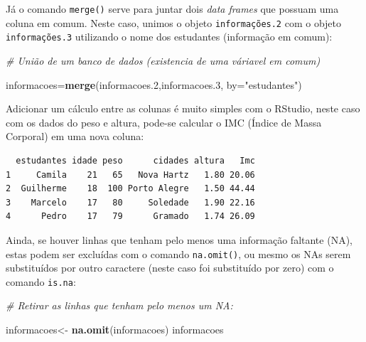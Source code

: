 \documentclass[12pt,brazil,oneside]{book}
\newenvironment{Shaded}{\begin{snugshade}}{\end{snugshade}}
\newcommand{\CommentTok}[1]{\textcolor[rgb]{0.56,0.35,0.01}{\textit{#1}}}
\newcommand{\DataTypeTok}[1]{\textcolor[rgb]{0.13,0.29,0.53}{#1}}
\newcommand{\DecValTok}[1]{\textcolor[rgb]{0.00,0.00,0.81}{#1}}
\newcommand{\FloatTok}[1]{\textcolor[rgb]{0.00,0.00,0.81}{#1}}
\newcommand{\KeywordTok}[1]{\textcolor[rgb]{0.13,0.29,0.53}{\textbf{#1}}}
\newcommand{\NormalTok}[1]{#1}
\newcommand{\OperatorTok}[1]{\textcolor[rgb]{0.81,0.36,0.00}{\textbf{#1}}}
\newcommand{\StringTok}[1]{\textcolor[rgb]{0.31,0.60,0.02}{#1}}
\begin{document}
Já o comando \texttt{merge()} serve para juntar dois \emph{data frames} que possuam uma coluna em comum. Neste caso, unimos o objeto \texttt{informações.2} com o objeto \texttt{informações.3} utilizando o nome dos estudantes (informação em comum):

\begin{Shaded}
\begin{Highlighting}[]
\CommentTok{# União de um banco de dados (existencia de uma váriavel em comum)}

\NormalTok{informacoes=}\KeywordTok{merge}\NormalTok{(informacoes}\FloatTok{.2}\NormalTok{,informacoes}\FloatTok{.3}\NormalTok{, }\DataTypeTok{by=}\StringTok{"estudantes"}\NormalTok{)}
\end{Highlighting}
\end{Shaded}

Adicionar um cálculo entre as colunas é muito simples com o RStudio, neste caso com os dados do peso e altura, pode-se calcular o IMC (Índice de Massa Corporal) em uma nova coluna:

\begin{Shaded}
\end{Shaded}

\begin{verbatim}
  estudantes idade peso      cidades altura   Imc
1     Camila    21   65   Nova Hartz   1.80 20.06
2  Guilherme    18  100 Porto Alegre   1.50 44.44
3    Marcelo    17   80     Soledade   1.90 22.16
4      Pedro    17   79      Gramado   1.74 26.09
\end{verbatim}

Ainda, se houver linhas que tenham pelo menos uma informação faltante (NA), estas podem ser excluídas com o comando \texttt{na.omit()}, ou mesmo os NAs serem substituídos por outro caractere (neste caso foi substituído por zero) com o comando \texttt{is.na}:

\begin{Shaded}
\begin{Highlighting}[]
\CommentTok{# Retirar as linhas que tenham pelo menos um NA:}

\NormalTok{informacoes<-}\StringTok{ }\KeywordTok{na.omit}\NormalTok{(informacoes)}
\NormalTok{informacoes}
\end{Highlighting}
\end{Shaded}
\end{document}
